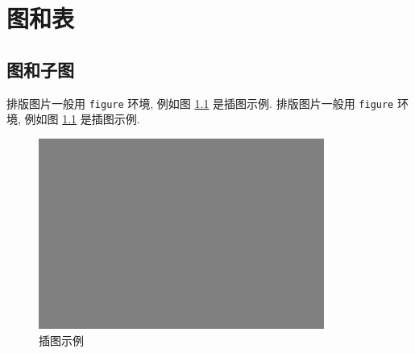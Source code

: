 \documentclass[final]{ncuthesis}
\begin{document}
\chapter{图和表}
\section{图和子图}
排版图片一般用 \verb|figure| 环境, 例如图 \ref{fig:figexp} 是插图示例. 排版图片一般用 \verb|figure| 环境, 例如图 \ref{fig:figexp} 是插图示例. 

\begin{figure}[htb]%
\centering
\includegraphics{figures/test.pdf}%
\caption{插图示例}%
\label{fig:figexp}%
\end{figure}
\end{document}

